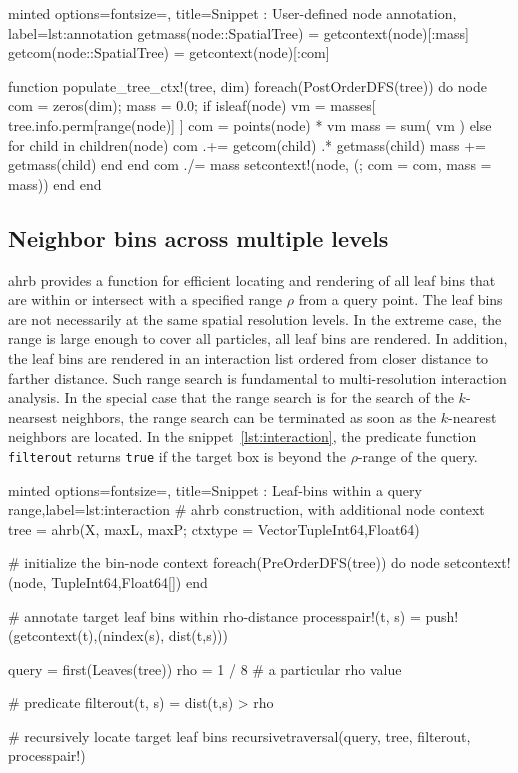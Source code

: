 \documentclass[final]{juliacon}
\begin{document}
\begin{myjulia}{%
    minted options={fontsize=\footnotesize},
    title={Snippet \thetcbcounter: User-defined node annotation},
    label=lst:annotation}
getmass(node::SpatialTree) = getcontext(node)[:mass]
getcom(node::SpatialTree)  = getcontext(node)[:com]

function populate_tree_ctx!(tree, dim)
  foreach(PostOrderDFS(tree)) do node
    com = zeros(dim); mass = 0.0;
    if isleaf(node)
      vm = masses[ tree.info.perm[range(node)] ]
      com  = points(node) * vm
      mass = sum( vm )    
    else
      for child in children(node)
        com .+= getcom(child) .* getmass(child)
        mass += getmass(child)
      end
    end
    com ./= mass
    setcontext!(node, (; com = com, mass = mass))
  end
end
\end{myjulia}  

 
\subsection{Neighbor bins across multiple levels}
\label{sec:neighbor-bins}

%
%
%

{\sc ahrb} provides a function for efficient locating and rendering of
all leaf bins that are within or intersect with a specified range
$\rho$ from a query point. The leaf bins are not necessarily at the
same spatial resolution levels. In the extreme case, the range is
large enough to cover all particles, all leaf bins are rendered.  In
addition, the leaf bins are rendered in an interaction list ordered
from closer distance to farther distance. Such range search is
fundamental to multi-resolution interaction analysis.  In the special
case that the range search is for the search of the $k$-nearsest
neighbors, the range search can be terminated as soon as the
$k$-nearest neighbors are located.  In the snippet~\ref{lst:interaction}, the predicate
function \texttt{filterout} returns \texttt{true} if the target box is
beyond the $\rho$-range of the query.

\begin{myjulia}{%
    minted options={fontsize=\footnotesize},
    title={Snippet \thetcbcounter: Leaf-bins within a query range},label=lst:interaction}
# ahrb construction, with additional node context 
tree = ahrb(X, maxL, maxP; 
  ctxtype = Vector{Tuple{Int64,Float64}})

# initialize the bin-node context 
foreach(PreOrderDFS(tree)) do node
  setcontext!(node, Tuple{Int64,Float64}[])
end

# annotate target leaf bins within rho-distance  
processpair!(t, s) =
  push!(getcontext(t),(nindex(s), dist(t,s)))

query = first(Leaves(tree))
rho = 1 / 8       # a particular rho value 

# predicate
filterout(t, s) = dist(t,s) > rho

# recursively locate target leaf bins
recursivetraversal(query, tree,
  filterout, processpair!) 
\end{myjulia}
\end{document}
